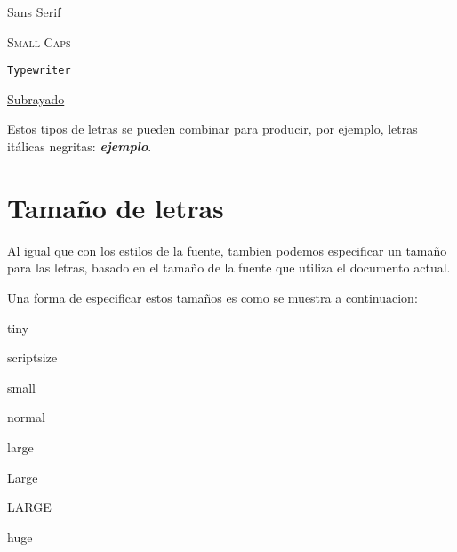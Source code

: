 \documentclass[letterpaper,12pt]{report}
\begin{document}
\smallskip

\textsf{Sans Serif}

\smallskip

\textsc{Small Caps}

\smallskip

\texttt{Typewriter}

\underline{Subrayado}

Estos tipos de letras se pueden combinar para producir, por ejemplo, letras itálicas negritas: \textbf{\textit{ejemplo}}.


\chapter{Tamaño de letras}

Al igual que con los estilos de la fuente, tambien podemos especificar un tamaño para las letras, basado en el tamaño de la fuente que utiliza el documento actual.

Una forma de especificar estos tamaños es como se muestra a continuacion:

{\tiny tiny} %

{\scriptsize scriptsize}

{\small small}

{\normalsize normal}

{\large large}

{\Large Large}

{\LARGE LARGE}

{\huge huge}
\end{document}
